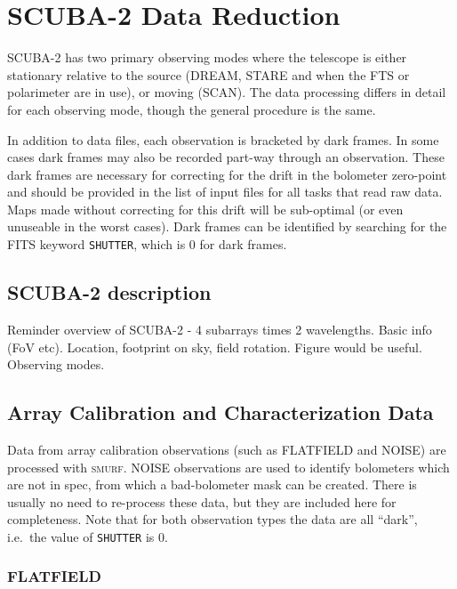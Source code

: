\documentclass[twoside,11pt]{article}
\newcommand{\xlabel}[1]{}
\renewcommand{\_}{\texttt{\symbol{95}}}
\newcommand{\SMURF}{\textsc{smurf}}
\begin{document}
\section{\xlabel{scuba2}SCUBA-2 Data Reduction\label{se:sc2dr}}

SCUBA-2 has two primary observing modes where the telescope is either
stationary relative to the source (DREAM, STARE and when the FTS or
polarimeter are in use), or moving (SCAN). The data processing differs
in detail for each observing mode, though the general procedure is the
same.

In addition to data files, each observation is bracketed by dark
frames. In some cases dark frames may also be recorded part-way
through an observation. These dark frames are necessary for correcting
for the drift in the bolometer zero-point and should be provided in
the list of input files for all tasks that read raw data. Maps made
without correcting for this drift will be sub-optimal (or even
unuseable in the worst cases). Dark frames can be identified by
searching for the FITS keyword \texttt{SHUTTER}, which is 0 for dark
frames.

\subsection{\xlabel{scuba2}SCUBA-2 description\label{se:scuba2}}

Reminder overview of SCUBA-2 - 4 subarrays times 2 wavelengths. Basic
info (FoV etc). Location, footprint on sky, field rotation. Figure
would be useful. Observing modes.

\subsection{\xlabel{arraycal}Array Calibration and Characterization Data\label{se:arraycal}}

Data from array calibration observations (such as FLATFIELD and NOISE)
are processed with \SMURF. NOISE observations are used to identify
bolometers which are not in spec, from which a bad-bolometer mask can
be created. There is usually no need to re-process these data, but
they are included here for completeness. Note that for both
observation types the data are all ``dark'', i.e.\ the value of
\texttt{SHUTTER} is 0.

\subsubsection{\xlabel{flatcal}FLATFIELD\label{se:flatcal}}
\end{document}
